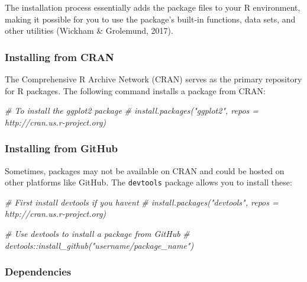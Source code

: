 \documentclass[
  b5paper]{book}
\newenvironment{Shaded}{\begin{snugshade}}{\end{snugshade}}
\newcommand{\CommentTok}[1]{\textcolor[rgb]{0.56,0.35,0.01}{\textit{#1}}}
\begin{document}
The installation process essentially adds the package files to your R environment, making it possible for you to use the package's built-in functions, data sets, and other utilities (Wickham \& Grolemund, 2017).

\hypertarget{installing-from-cran}{%
\subsubsection*{Installing from CRAN}\label{installing-from-cran}}

The Comprehensive R Archive Network (CRAN) serves as the primary repository for R packages. The following command installs a package from CRAN:

\begin{Shaded}
\begin{Highlighting}[]
\CommentTok{\# To install the ggplot2 package}
\CommentTok{\# install.packages("ggplot2", repos = \textquotesingle{}http://cran.us.r{-}project.org\textquotesingle{})}
\end{Highlighting}
\end{Shaded}

\hypertarget{installing-from-github}{%
\subsubsection*{Installing from GitHub}\label{installing-from-github}}

Sometimes, packages may not be available on CRAN and could be hosted on other platforms like GitHub. The \texttt{devtools} package allows you to install these:

\begin{Shaded}
\begin{Highlighting}[]
\CommentTok{\# First install devtools if you haven\textquotesingle{}t}
\CommentTok{\# install.packages("devtools", repos = \textquotesingle{}http://cran.us.r{-}project.org\textquotesingle{})}

\CommentTok{\# Use devtools to install a package from GitHub}
\CommentTok{\# devtools::install\_github("username/package\_name")}
\end{Highlighting}
\end{Shaded}

\hypertarget{dependencies}{%
\subsubsection*{Dependencies}\label{dependencies}}
\end{document}
